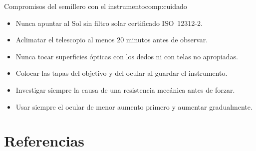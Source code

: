 \documentclass[12pt,oneside]{book}
\begin{document}
\begin{compromiso}{Compromisos del semillero con el instrumento}{comp:cuidado}
    \begin{itemize}[leftmargin=1.5em]
        \item Nunca apuntar al Sol sin filtro solar certificado ISO~12312-2.
        \item Aclimatar el telescopio al menos 20 minutos antes de observar.
        \item Nunca tocar superficies ópticas con los dedos ni con telas no apropiadas.
        \item Colocar las tapas del objetivo y del ocular al guardar el instrumento.
        \item Investigar siempre la causa de una resistencia mecánica antes de forzar.
        \item Usar siempre el ocular de menor aumento primero y aumentar gradualmente.
    \end{itemize}
\end{compromiso}

\backmatter
\chapter*{Referencias}
\end{document}
